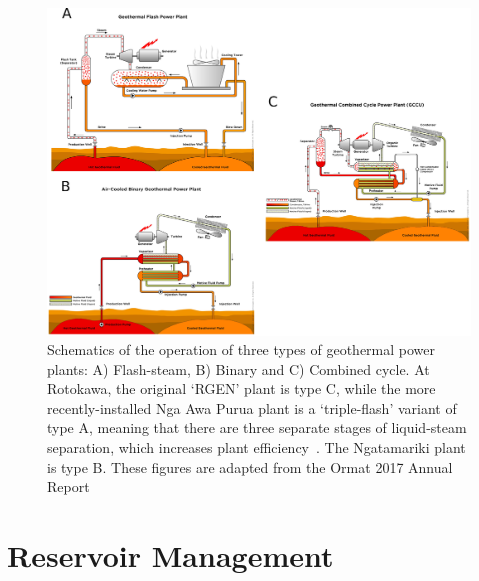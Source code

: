 \begin{figure}
\begin{center}
\includegraphics[width=\textwidth,height=0.5\textheight,keepaspectratio]{Chapter_1_Intro/figures/ORMAT_techs_overview/ORMAT_techs_overview_original.png}
\caption{{Schematics of the operation of three types of geothermal power plants:
A) Flash-steam, B) Binary and C) Combined cycle. At Rotokawa, the
original `RGEN' plant is type C, while the more recently-installed Nga
Awa Purua plant is a `triple-flash' variant of type A, meaning that
there are three separate stages of liquid-steam separation, which
increases plant efficiency~\protect\cite{DiPippo_2016}. The Ngatamariki plant is
type B. These figures are adapted from the Ormat 2017 Annual
Report~\protect\cite{Ormat_2018}
{\label{836935}}%
}}
\end{center}
\end{figure}

\section{Reservoir Management}
